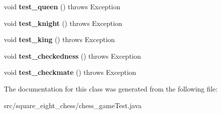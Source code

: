 \begin{DoxyCompactItemize}
\item 
\hypertarget{classsquare__eight__chess_1_1chess__gameTest_ab4b66c800b00adc8779de0c8939a9a61}{}void {\bfseries test\+\_\+queen} ()  throws Exception \label{classsquare__eight__chess_1_1chess__gameTest_ab4b66c800b00adc8779de0c8939a9a61}

\item 
\hypertarget{classsquare__eight__chess_1_1chess__gameTest_a9f7b3f5296115fc1a9853da259042932}{}void {\bfseries test\+\_\+knight} ()  throws Exception \label{classsquare__eight__chess_1_1chess__gameTest_a9f7b3f5296115fc1a9853da259042932}

\item 
\hypertarget{classsquare__eight__chess_1_1chess__gameTest_a167930c1a9b5353fd0c0abb6892b79f6}{}void {\bfseries test\+\_\+king} ()  throws Exception \label{classsquare__eight__chess_1_1chess__gameTest_a167930c1a9b5353fd0c0abb6892b79f6}

\item 
\hypertarget{classsquare__eight__chess_1_1chess__gameTest_ab6b0d2fe1bf4f49c89deb32eece458c2}{}void {\bfseries test\+\_\+checkedness} ()  throws Exception \label{classsquare__eight__chess_1_1chess__gameTest_ab6b0d2fe1bf4f49c89deb32eece458c2}

\item 
\hypertarget{classsquare__eight__chess_1_1chess__gameTest_abffaf55ec4431e93db1bf53dd045f4e9}{}void {\bfseries test\+\_\+checkmate} ()  throws Exception \label{classsquare__eight__chess_1_1chess__gameTest_abffaf55ec4431e93db1bf53dd045f4e9}

\end{DoxyCompactItemize}


The documentation for this class was generated from the following file\+:\begin{DoxyCompactItemize}
\item 
src/square\+\_\+eight\+\_\+chess/chess\+\_\+game\+Test.\+java\end{DoxyCompactItemize}
